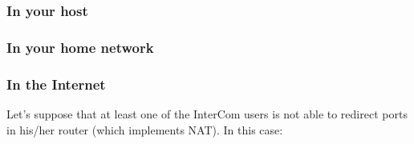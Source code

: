 \subsubsection{In your host}

\subsubsection{In your home network}

\subsubsection{In the Internet}

Let's suppose that at least one of the InterCom users is not able to
redirect ports in his/her router (which implements NAT). In this case:


